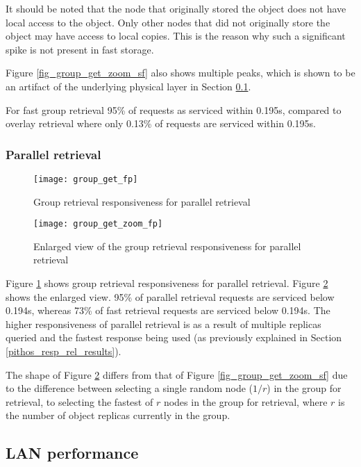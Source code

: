 It should be noted that the node that originally stored the object does not have local access to the object. Only other nodes that did not originally store the object may have access to local copies. This is the reason why such a significant spike is not present in fast storage.

Figure \ref{fig_group_get_zoom_sf} also shows multiple peaks, which is shown to be an artifact of the underlying physical layer in Section \ref{lan_retrieval}.

For fast group retrieval 95\% of requests as serviced within 0.195s, compared to overlay retrieval where only 0.13\% of requests are serviced within 0.195s.

\subsubsection{Parallel retrieval}
\begin{figure}[htbp]
 \centering
 \texttt{[image: group\_get\_fp]}
 \caption{Group retrieval responsiveness for parallel retrieval}
 \label{fig_group_get_fp}
\end{figure}

\begin{figure}[htbp]
 \centering
 \texttt{[image: group\_get\_zoom\_fp]}
 \caption{Enlarged view of the group retrieval responsiveness for parallel retrieval}
 \label{fig_group_get_zoom_fp}
\end{figure}
%
Figure \ref{fig_group_get_fp} shows group retrieval responsiveness for parallel retrieval. Figure \ref{fig_group_get_zoom_fp} shows the enlarged view. 95\% of parallel retrieval requests are serviced below 0.194s, whereas 73\% of fast retrieval requests are serviced below 0.194s. The higher responsiveness of parallel retrieval is as a result of multiple replicas queried and the fastest response being used (as previously explained in Section \ref{pithos_resp_rel_results}).

The shape of Figure \ref{fig_group_get_zoom_fp} differs from that of Figure \ref{fig_group_get_zoom_sf} due to the difference between selecting a single random node ($1/r$) in the group for retrieval, to selecting the fastest of $r$ nodes in the group for retrieval, where $r$ is the number of object replicas currently in the group.

\subsection{LAN performance}
\label{lan_retrieval}

